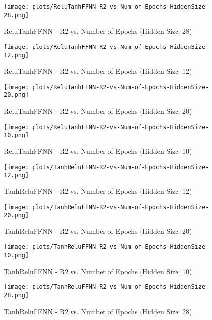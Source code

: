 
\begin{figure}[H]
    \centering
    \texttt{[image: plots/ReluTanhFFNN-R2-vs-Num-of-Epochs-HiddenSize-28.png]}
    \caption{ReluTanhFFNN - R2 vs. Number of Epochs (Hidden Size: 28)}
\end{figure}

\begin{figure}[H]
    \centering
    \texttt{[image: plots/ReluTanhFFNN-R2-vs-Num-of-Epochs-HiddenSize-12.png]}
    \caption{ReluTanhFFNN - R2 vs. Number of Epochs (Hidden Size: 12)}
\end{figure}

\begin{figure}[H]
    \centering
    \texttt{[image: plots/ReluTanhFFNN-R2-vs-Num-of-Epochs-HiddenSize-20.png]}
    \caption{ReluTanhFFNN - R2 vs. Number of Epochs (Hidden Size: 20)}
\end{figure}

\begin{figure}[H]
    \centering
    \texttt{[image: plots/ReluTanhFFNN-R2-vs-Num-of-Epochs-HiddenSize-10.png]}
    \caption{ReluTanhFFNN - R2 vs. Number of Epochs (Hidden Size: 10)}
\end{figure}

\begin{figure}[H]
    \centering
    \texttt{[image: plots/TanhReluFFNN-R2-vs-Num-of-Epochs-HiddenSize-12.png]}
    \caption{TanhReluFFNN - R2 vs. Number of Epochs (Hidden Size: 12)}
\end{figure}

\begin{figure}[H]
    \centering
    \texttt{[image: plots/TanhReluFFNN-R2-vs-Num-of-Epochs-HiddenSize-20.png]}
    \caption{TanhReluFFNN - R2 vs. Number of Epochs (Hidden Size: 20)}
\end{figure}

\begin{figure}[H]
    \centering
    \texttt{[image: plots/TanhReluFFNN-R2-vs-Num-of-Epochs-HiddenSize-10.png]}
    \caption{TanhReluFFNN - R2 vs. Number of Epochs (Hidden Size: 10)}
\end{figure}

\begin{figure}[H]
    \centering
    \texttt{[image: plots/TanhReluFFNN-R2-vs-Num-of-Epochs-HiddenSize-28.png]}
    \caption{TanhReluFFNN - R2 vs. Number of Epochs (Hidden Size: 28)}
\end{figure}

